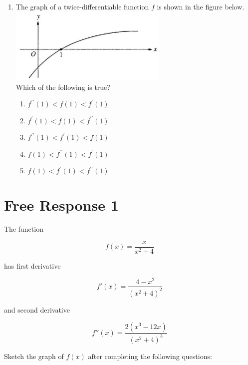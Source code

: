 \documentclass{article}
\begin{document}
\begin{enumerate}
	\item
	\begin{minipage}[t]{\linewidth}
		The graph of a twice-differentiable function \(f\) is shown in the
figure below.\\
\includegraphics[width=2.9833333333333334in]{media/d7b0a695-c4ff-5482-a58c-e1186654c6aa.jpg}\\
Which of the following is true?
\vspace{1em}
		\begin{enumerate}
		\itemsep1em
			\item \(f^{\prime \prime}(1)<f(1)<f^{\prime}(1)\)
			\item \(f^{\prime}(1)<f(1)<f^{\prime \prime}(1)\)
			\item \(f^{\prime \prime}(1)<f^{\prime}(1)<f(1)\)
			\item \(f(1)<f^{\prime \prime}(1)<f^{\prime}(1)\)
			\item \(f(1)<f^{\prime}(1)<f^{\prime \prime}(1)\)
		\end{enumerate}
	\end{minipage}
\end{enumerate}


\clearpage
\section{Free Response 1}

The function

$$
f(x)=\frac{x}{x^{2}+4}
$$

has first derivative

$$
f'(x) = \frac{4-x^2}{\left(x^2+4\right)^2}
$$

and second derivative

$$
f''(x) = \frac{2 \left(x^3-12 x\right)}{\left(x^2+4\right)^3}
$$

Sketch the graph of $f(x)$ after completing the following questions:
\end{document}
